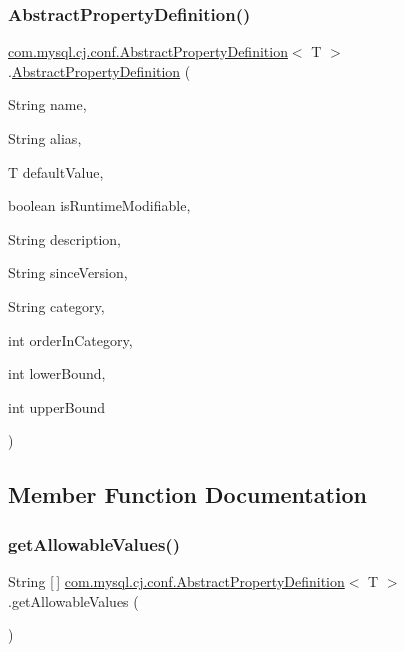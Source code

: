 \subsubsection{\texorpdfstring{Abstract\+Property\+Definition()}{AbstractPropertyDefinition()}\hspace{0.1cm}{\footnotesize\ttfamily [2/2]}}
{\footnotesize\ttfamily \mbox{\hyperlink{classcom_1_1mysql_1_1cj_1_1conf_1_1_abstract_property_definition}{com.\+mysql.\+cj.\+conf.\+Abstract\+Property\+Definition}}$<$ T $>$.\mbox{\hyperlink{classcom_1_1mysql_1_1cj_1_1conf_1_1_abstract_property_definition}{Abstract\+Property\+Definition}} (\begin{DoxyParamCaption}\item[{String}]{name,  }\item[{String}]{alias,  }\item[{T}]{default\+Value,  }\item[{boolean}]{is\+Runtime\+Modifiable,  }\item[{String}]{description,  }\item[{String}]{since\+Version,  }\item[{String}]{category,  }\item[{int}]{order\+In\+Category,  }\item[{int}]{lower\+Bound,  }\item[{int}]{upper\+Bound }\end{DoxyParamCaption})}



\subsection{Member Function Documentation}
\mbox{\label{classcom_1_1mysql_1_1cj_1_1conf_1_1_abstract_property_definition_a3dc8d82d1870d9a7ad201b6552f77610}} 
\subsubsection{\texorpdfstring{get\+Allowable\+Values()}{getAllowableValues()}}
{\footnotesize\ttfamily String \mbox{[}$\,$\mbox{]} \mbox{\hyperlink{classcom_1_1mysql_1_1cj_1_1conf_1_1_abstract_property_definition}{com.\+mysql.\+cj.\+conf.\+Abstract\+Property\+Definition}}$<$ T $>$.get\+Allowable\+Values (\begin{DoxyParamCaption}{ }\end{DoxyParamCaption})}

